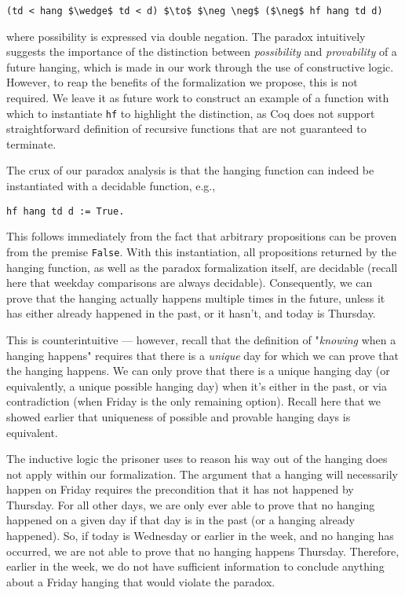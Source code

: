 \documentclass[runningheads]{llncs}
\begin{document}
\begin{lstlisting}[mathescape=true]
    (td < hang $\wedge$ td < d) $\to$ $\neg \neg$ ($\neg$ hf hang td d)
\end{lstlisting}

where possibility is expressed via double negation. The paradox intuitively
suggests the importance of the distinction between \emph{possibility} and \emph{provability}
of a future hanging, which is made in our work through the use of constructive
logic. However, to reap the benefits of the formalization we propose, this is
not required.
We leave it as future work to construct an example of a
function with which to instantiate {\tt hf} to highlight the distinction,
as Coq does not support straightforward definition of recursive functions that are
not guaranteed to terminate.

The crux of our paradox analysis
is that the hanging function can indeed be instantiated with a decidable
function, e.g.,

\begin{lstlisting}[mathescape=true]
    hf hang td d := True.
\end{lstlisting}

This follows immediately from the fact that arbitrary propositions can be proven
from the premise {\tt False}. With this instantiation, all propositions
returned by the hanging function, as well as the paradox formalization itself,
are decidable (recall here that weekday comparisons are always decidable).
Consequently, we can prove that the hanging actually happens
multiple times in the future, unless it has either already happened in the past,
or it hasn't, and today is Thursday.

This is counterintuitive --- however, recall that the
definition of "\emph{knowing} when a hanging happens" requires that there
is a \emph{unique}
day for which we can prove that the hanging happens. We can only prove that
there is a unique hanging day (or equivalently, a unique possible hanging day)
when it's either in the past, or via contradiction (when Friday is the only remaining option).
Recall here that we showed earlier that uniqueness of possible and provable
hanging days is equivalent.

The inductive logic the prisoner uses to reason his way out of the hanging does
not apply within our formalization.
The argument that a hanging will necessarily happen on Friday requires the
precondition that it has not happened by Thursday. For all other days,
we are only ever able to prove
that no hanging happened on a given day if that day is in the past (or a hanging
already happened). So, if today is Wednesday or earlier
in the week, and no hanging has occurred, we are not able to prove that no hanging
happens Thursday. Therefore, earlier in the week, we do not have sufficient
information to conclude
anything about a Friday hanging that would violate the paradox.
\end{document}
